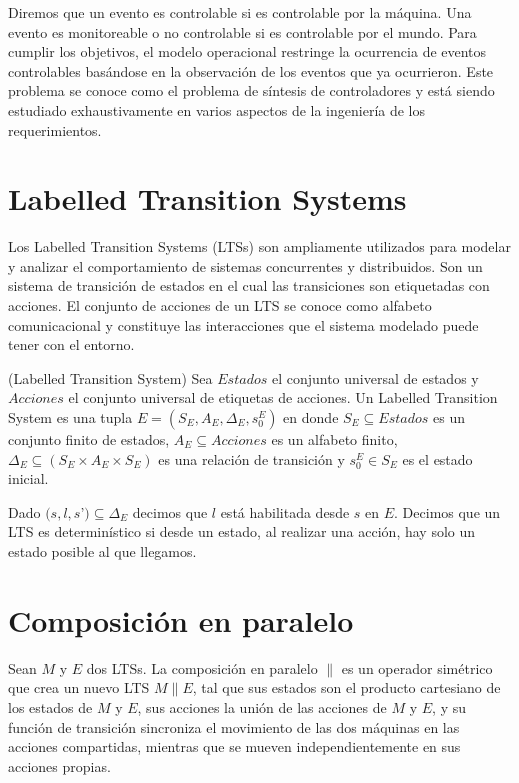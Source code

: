 \vspace{\baselineskip}
Diremos que un evento es controlable si es controlable por la máquina. Una evento es monitoreable o no controlable si es
controlable por el mundo. 
Para cumplir los objetivos, el modelo operacional restringe la ocurrencia de eventos controlables basándose en la observación
de los eventos que ya ocurrieron.
Este problema se conoce como el problema de síntesis de controladores y está siendo estudiado exhaustivamente en varios
aspectos de la ingeniería de los requerimientos.

\section{Labelled Transition Systems}
Los Labelled Transition Systems \cite{LTS} (LTSs) son ampliamente utilizados para modelar y analizar el comportamiento de sistemas
concurrentes y distribuidos. Son un sistema de transición de estados en el cual las transiciones son etiquetadas con
acciones. El conjunto de acciones de un LTS se conoce como alfabeto comunicacional y constituye las interacciones que
el sistema modelado puede tener con el entorno.

\begin{definition}{(Labelled Transition System)}
Sea $Estados$ el conjunto universal de estados y $Acciones$ el conjunto universal de etiquetas de acciones. Un Labelled
Transition System es una tupla $E = (S_{E}, A_{E}, \Delta_{E}, s_{0}^{E})$ en donde $S_{E} \subseteq Estados$ es un conjunto
finito de estados, $A_{E} \subseteq Acciones$ es un alfabeto finito, $\Delta_{E} \subseteq (S_{E} \times A_{E} \times S_{E})$ es una
relación de transición y $s_{0}^{E} \in S_{E}$ es el estado inicial.
\end{definition}

Dado $(s, l, s$’$) \subseteq \Delta_{E}$ decimos que $l$ está habilitada desde $s$ en $E$. Decimos que un LTS es
determinístico si desde un estado, al realizar una acción, hay solo un estado posible al que llegamos.

\section{Composición en paralelo}

Sean $M$ y $E$ dos LTSs. La composición en paralelo $\parallel$ es un operador simétrico que crea un nuevo LTS $M \parallel E$, 
tal que sus estados son el producto cartesiano de los estados de $M$ y $E$, sus acciones la unión de las acciones de $M$ y $E$, 
y su función de transición sincroniza el movimiento de las dos máquinas en las acciones compartidas, mientras que se 
mueven independientemente en sus acciones propias.

